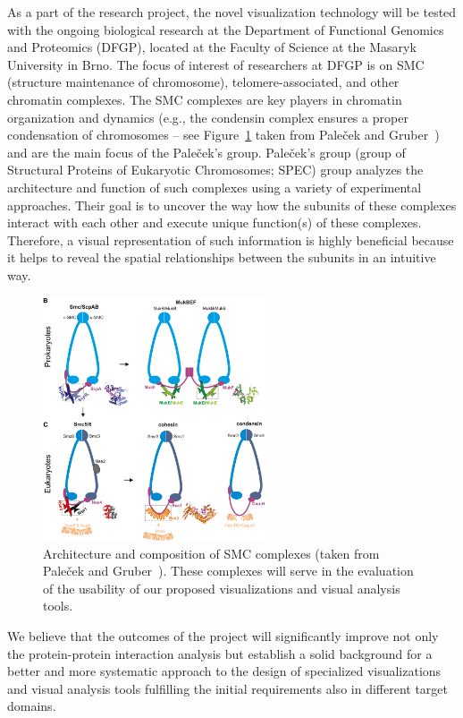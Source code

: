 \documentclass[11pt,a4paper,titlepage,oneside,onecolumn]{article}
\begin{document}
As a part of the research project, the novel visualization technology will be tested with the ongoing biological research at the Department of Functional Genomics and Proteomics (DFGP), located at the Faculty of Science at the Masaryk University in Brno. 
The focus of interest of researchers at DFGP is on SMC (structure maintenance of chromosome), telomere-associated, and other chromatin complexes. 
The SMC complexes are key players in chromatin organization and dynamics (e.g., the condensin complex ensures a proper condensation of chromosomes -- see Figure~\ref{fig:telomere} taken from Pale\v{c}ek and Gruber~\cite{Palecek2015}) and are the main focus of the Pale\v{c}ek's group.
Pale\v{c}ek's group (group of Structural Proteins of Eukaryotic Chromosomes; SPEC) group analyzes the architecture and function of such complexes using a variety of experimental approaches. 
Their goal is to uncover the way how the subunits of these complexes interact with each other and execute unique function(s) of these complexes. 
Therefore, a visual representation of such information is highly beneficial because it helps to reveal the spatial relationships between the subunits in an intuitive way.

\begin{figure}[h]
  \centering
  \includegraphics[width=0.6\textwidth]{pics/telomer.png}
  \caption{Architecture and composition of SMC complexes (taken from Pale\v{c}ek and Gruber~\cite{Palecek2015}). These complexes will serve in the evaluation of the usability of our proposed visualizations and visual analysis tools.}
  \label{fig:telomere}
\end{figure}

We believe that the outcomes of the project will significantly improve not only the protein-protein interaction analysis but establish a solid background for a better and more systematic approach to the design of specialized visualizations and visual analysis tools fulfilling the initial requirements also in different target domains.
\end{document}
